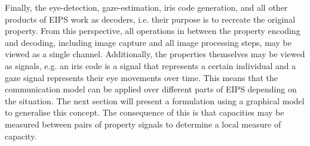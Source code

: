Finally, the eye-detection, gaze-estimation, iris code generation, and all other products of EIPS work as decoders, i.e. their purpose is to recreate the original property. From this perspective, all operations in between the property encoding and decoding, including image capture and all image processing steps, may be viewed as a single channel. Additionally, the properties themselves may be viewed as signals, e.g. an iris code is a signal that represents a certain individual and a gaze signal represents their eye movements over time. This means that the communication model can be applied over different parts of EIPS depending on the situation. The next section will present a formulation using a graphical model to generalise this concept. The consequence of this is that capacities may be measured between pairs of property signals to determine a local measure of capacity. 


